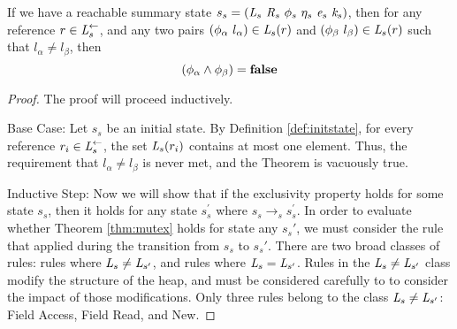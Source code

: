 \begin{theorem}
\label{thm:mutex}
If we have a reachable summary state $s_s = ( \cfgnt{L}_s\ \cfgnt{R}_s\ \phi_s\ \eta_s\ \cfgnt{e}_s\ \cfgnt{k}_s )$, then for any reference $r \in \emph{L}_s^\leftarrow$, and any two pairs $(\phi_\alpha\ l_\alpha) \in \emph{L}_s(r)$ and $(\phi_\beta\ l_\beta) \in \emph{L}_s(r)$ such that $l_\alpha \ne l_\beta$, then
$$(\phi_\alpha \wedge \phi_\beta) = \textbf{false}$$
\end{theorem}
\begin{proof}
The proof will proceed inductively. 

Base Case: Let $s_s$ be an initial state. By Definition \ref{def:initstate}, for every reference $r_i \in \emph{L}_s^\leftarrow$, the set $\emph{L}_s(r_i)$ contains at most one element. Thus, the requirement that $l_\alpha \ne l_\beta$ is never met, and the Theorem is vacuously true.

Inductive Step: Now we will show that if the exclusivity property holds for some state $s_s$, then it holds for any state $s_s^\prime$ where $s_s \rightarrow_s s_s^\prime$. In order to evaluate whether Theorem \ref{thm:mutex} holds for state any $s_s\prime$, we must consider the rule that applied during the transition from $s_s$ to $s_s\prime$. There are two broad classes of rules: rules where $ \emph{L}_s \neq  \emph{L}_{s^\prime}$, and rules where $ \emph{L}_s =  \emph{L}_{s^\prime}$. Rules in the $ \emph{L}_s \neq  \emph{L}_{s^\prime}$ class modify the structure of the heap, and must be considered carefully to to consider the impact of those modifications. Only three rules belong to the class $ \emph{L}_s \neq  \emph{L}_{s^\prime}$: Field Access, Field Read, and New. 


\end{proof}
